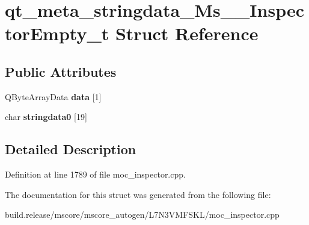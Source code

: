 \hypertarget{structqt__meta__stringdata___ms_____inspector_empty__t}{}\section{qt\+\_\+meta\+\_\+stringdata\+\_\+\+Ms\+\_\+\+\_\+\+Inspector\+Empty\+\_\+t Struct Reference}
\label{structqt__meta__stringdata___ms_____inspector_empty__t}
\subsection*{Public Attributes}
\begin{DoxyCompactItemize}
\item 
\mbox{\label{structqt__meta__stringdata___ms_____inspector_empty__t_a88d69aaab8aca7d0013c2323e1b66e8b}} 
Q\+Byte\+Array\+Data {\bfseries data} \mbox{[}1\mbox{]}
\item 
\mbox{\label{structqt__meta__stringdata___ms_____inspector_empty__t_a511033389785dc033729175080dcc9f4}} 
char {\bfseries stringdata0} \mbox{[}19\mbox{]}
\end{DoxyCompactItemize}


\subsection{Detailed Description}


Definition at line 1789 of file moc\+\_\+inspector.\+cpp.



The documentation for this struct was generated from the following file\+:\begin{DoxyCompactItemize}
\item 
build.\+release/mscore/mscore\+\_\+autogen/\+L7\+N3\+V\+M\+F\+S\+K\+L/moc\+\_\+inspector.\+cpp\end{DoxyCompactItemize}

